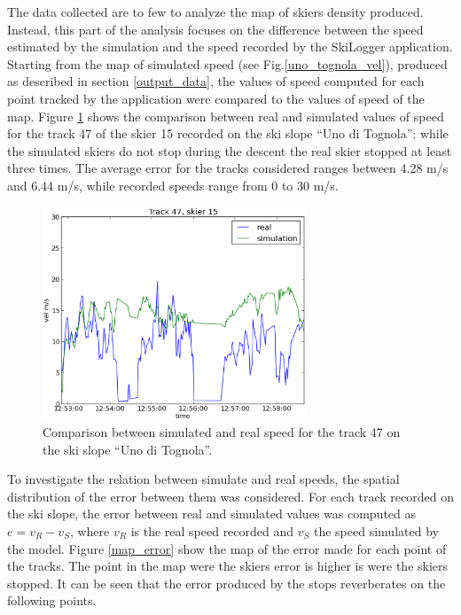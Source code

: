 \documentclass[12pt,a4paper,twoside]{book}
\begin{document}
The data collected are to few to analyze the map of skiers density produced. Instead, this part of the analysis focuses on the difference between the speed estimated by the simulation and the speed recorded by the SkiLogger application. Starting from the map of simulated speed (see Fig.\ref{uno_tognola_vel}), produced as described in section \ref{output_data}, the values of speed computed for each point tracked by the application were compared to the values of speed of the map. Figure \ref{sm_track47} shows the comparison between real and simulated values of speed for the track 47 of the skier 15 recorded on the ski slope ``Uno di Tognola'': while the simulated skiers do not stop during the descent the real skier stopped at least three times. The average error for the tracks considered ranges between 4.28 m/s and 6.44 m/s, while recorded speeds range from 0 to 30 m/s.

\begin{figure}[!b]
  \begin{center}
    \includegraphics[width=0.7\textwidth]{images/sm_track47.eps}
    \caption{Comparison between simulated and real speed for the track 47 on the ski slope ``Uno di Tognola''.}\label{sm_track47}
  \end{center}
\end{figure}

To investigate the relation between simulate and real speeds, the spatial distribution of the error between them was considered. For each track recorded on the ski slope, the error between real and simulated values was computed as $e=v_R-v_S$, where $v_R$ is the real speed recorded and $v_S$ the speed simulated by the model. Figure \ref{map_error} show the map of the error made for each point of the tracks. The point in the map were the skiers error is higher is were the skiers stopped. It can be seen that the error produced by the stops reverberates on the following points.
\end{document}
